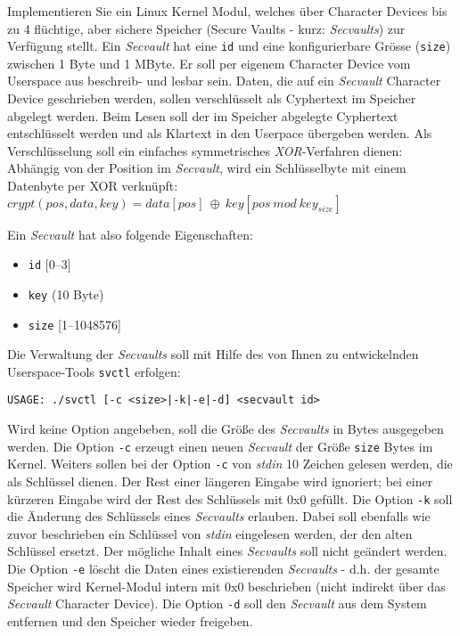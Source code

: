 \documentclass{article}
\begin{document}
Implementieren Sie ein Linux Kernel Modul, welches {\"u}ber Character Devices bis zu 4 fl{\"u}chtige, aber sichere Speicher (Secure Vaults - kurz: \emph{Secvaults}) zur Verf{\"u}gung stellt.
Ein \emph{Secvault} hat eine \texttt{id} und eine konfigurierbare Gr{\"o}sse (\texttt{size}) zwischen 1 Byte und 1 MByte.
Er soll per eigenem Character Device vom Userspace aus beschreib- und lesbar sein. Daten, die auf ein \emph{Secvault} Character Device geschrieben werden, sollen verschl{\"u}sselt als Cyphertext im Speicher abgelegt werden.
Beim Lesen soll der im Speicher abgelegte Cyphertext entschl{\"u}sselt werden und als Klartext in den Userpace {\"u}bergeben werden.
Als Verschl{\"u}sselung soll ein einfaches symmetrisches \emph{XOR}-Verfahren dienen: Abh{\"a}ngig von der Position im \emph{Secvault}, wird ein Schl{\"u}sselbyte mit einem Datenbyte per XOR verkn{\"u}pft:\\
$crypt(pos, data, key) = data[pos]\ \oplus\ key[pos\ mod\ key_{size}]$

Ein \emph{Secvault} hat also folgende Eigenschaften:
\begin{itemize}
\item \texttt{id}   [0--3]
\item \texttt{key}  (10 Byte)
\item \texttt{size} [1--1048576]
\end{itemize}

Die Verwaltung der \emph{Secvaults} soll mit Hilfe des von Ihnen zu entwickelnden Userspace-Tools \texttt{svctl} erfolgen:
\begin{verbatim}
USAGE: ./svctl [-c <size>|-k|-e|-d] <secvault id>
\end{verbatim}

Wird keine Option angebeben, soll die Gr{\"o}{\ss}e des \emph{Secvaults} in Bytes ausgegeben werden.
Die Option \texttt{-c} erzeugt einen neuen \emph{Secvault} der
Gr{\"o}{\ss}e \texttt{size} Bytes im Kernel.
Weiters sollen bei der Option \texttt{-c} von \emph{stdin} 10 Zeichen gelesen werden, die als Schl{\"u}ssel dienen.
Der Rest einer l{\"a}ngeren Eingabe wird ignoriert; bei einer k{\"u}rzeren Eingabe wird der Rest des Schl{\"u}ssels mit 0x0 gef{\"u}llt.
Die Option \texttt{-k} soll die {\"A}nderung des Schl{\"u}ssels eines \emph{Secvaults} erlauben.
Dabei soll ebenfalls wie zuvor beschrieben ein Schl{\"u}ssel von \emph{stdin} eingelesen werden, der den alten Schl{\"u}ssel ersetzt.
Der m{\"o}gliche Inhalt eines \emph{Secvaults} soll nicht ge{\"a}ndert werden.
Die Option \texttt{-e} l{\"o}scht die Daten eines existierenden \emph{Secvaults} - d.h. der gesamte Speicher wird Kernel-Modul intern mit 0x0 beschrieben (nicht indirekt {\"u}ber das \emph{Secvault} Character Device).
Die Option \texttt{-d} soll den \emph{Secvault} aus dem System entfernen und den Speicher wieder freigeben.
\end{document}
